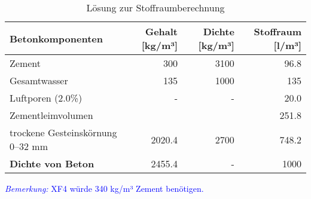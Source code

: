 \begin{questions}
\begin{solution}
            \begin{table}[H]
                \centering
                \caption{Lösung zur Stoffraumberechnung}
                \small
                \label{tab:Stoffraumberechnung-loesung}
                \begin{tabular}{lrrr}
                \toprule
                \textbf{Betonkomponenten}       & \textbf{Gehalt [kg/m³]} & \textbf{Dichte [kg/m³]} & \textbf{Stoffraum [l/m³]} \\ 
                \midrule
                Zement                           & 300                      & 3100                       & 96.8          \\
                Gesamtwasser                     & 135                      & 1000                        & 135          \\
                Luftporen (2.0\%)                & -                        & -                          & 20.0           \\
                Zementleimvolumen                &                          &                            & 251.8         \\
                trockene Gesteinskörnung 0–32 mm & 2020.4                     & 2700                       & 748.2       \\
                \midrule
                \textbf{Dichte von Beton}        & 2455.4                     &            -                 & 1000          \\
                \bottomrule
                \end{tabular}
            \end{table}

        \textcolor{blue}{\textit{Bemerkung:} XF4 würde  340 kg/m³ Zement benötigen.}
        \end{solution}

    
\end{questions}




